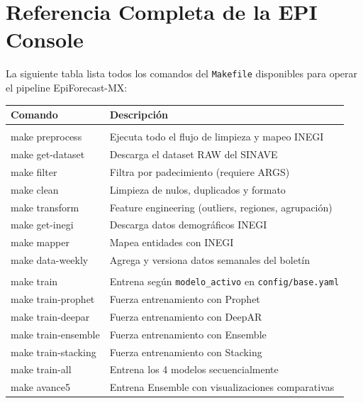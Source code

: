 \documentclass[12pt, letterpaper]{article}
\begin{document}
\newpage
\appendix

\section{Referencia Completa de la EPI Console}\label{sec:comandos}

La siguiente tabla lista todos los comandos del \texttt{Makefile} disponibles para operar el pipeline EpiForecast-MX:

\begin{longtable}{>{\ttfamily\scriptsize}l >{\raggedright\arraybackslash}p{8cm}}
\toprule
\textbf{Comando} & \textbf{Descripción} \\
\midrule
\endhead
\bottomrule
\endfoot
\multicolumn{2}{l}{\textit{Pipeline de datos}} \\
\midrule
make preprocess & Ejecuta todo el flujo de limpieza y mapeo INEGI \\
make get-dataset & Descarga el dataset RAW del SINAVE \\
make filter & Filtra por padecimiento (requiere ARGS) \\
make clean & Limpieza de nulos, duplicados y formato \\
make transform & Feature engineering (outliers, regiones, agrupación) \\
make get-inegi & Descarga datos demográficos INEGI \\
make mapper & Mapea entidades con INEGI \\
make data-weekly & Agrega y versiona datos semanales del boletín \\
\midrule
\multicolumn{2}{l}{\textit{Entrenamiento}} \\
\midrule
make train & Entrena según \texttt{modelo\_activo} en \texttt{config/base.yaml} \\
make train-prophet & Fuerza entrenamiento con Prophet \\
make train-deepar & Fuerza entrenamiento con DeepAR \\
make train-ensemble & Fuerza entrenamiento con Ensemble \\
make train-stacking & Fuerza entrenamiento con Stacking \\
make train-all & Entrena los 4 modelos secuencialmente \\
make avance5 & Entrena Ensemble con visualizaciones comparativas \\

\end{longtable}
\end{document}
